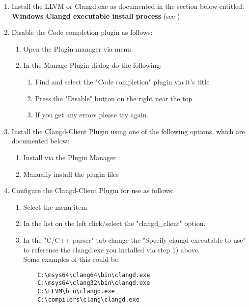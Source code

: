 \begin{enumerate}[noitemsep]
\item Install the LLVM or Clangd.exe as documented in the section below entitled: \\
          \textbf{Windows Clangd executable install process} (see )

\item Disable the Code completion plugin as follows:
    \begin{enumerate}[noitemsep]
    \item Open the Plugin manager via  \codeblocks menu \newline
    \item In the Manage Plugin dialog do the following:
        \begin{enumerate}[noitemsep]
        \item Find and select the "Code completion" plugin via it's title 
        \item Press the "Disable" button on the right near the top
        \item If you get any errors please try again.
        \end{enumerate}
    \end{enumerate}
	   
\item Install the Clangd-Client Plugin using one of the following options, which are documented below:
    \begin{enumerate}[noitemsep]
    \item Install via the Plugin Manager
    \item Manually install the plugin files
    \end{enumerate}
	
\item Configure the Clangd-Client Plugin for use as follows:
    \begin{enumerate}[noitemsep]
    \item Select the \codeblocks menu item 
    \item In the list on the left click/select the "clangd\_client" option.
    \item In the "C/C++ parser" tab change the "Specify clangd executable to use" to reference the clangd.exe you installed via step 1) above. \\ 
    Some examples of this could be:
    \begin{verbatim}
    C:\msys64\clang64\bin\clangd.exe
    C:\msys64\clang32\bin\clangd.exe
    C:\LLVM\bin\clangd.exe
    C:\compilers\clang\clangd.exe
    \end{verbatim}
    \end{enumerate}
\end{enumerate}


